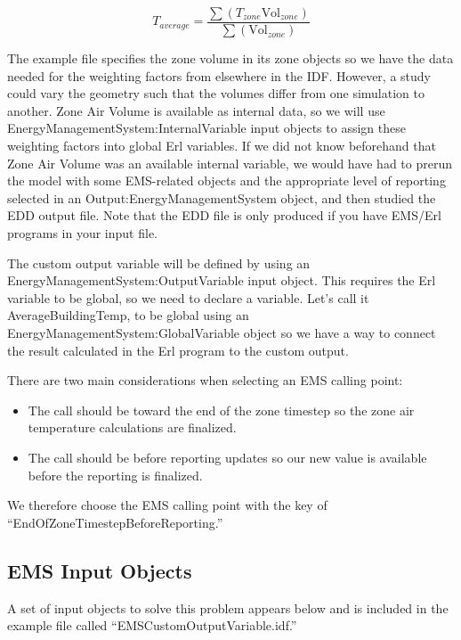 \begin{equation}
T_{average} = \frac{\sum\left(T_{zone}\text{Vol}_{zone}\right)}{\sum\left(\text{Vol}_{zone}\right)}
\end{equation}

The example file specifies the zone volume in its zone objects so we have the data needed for the weighting factors from elsewhere in the IDF. However, a study could vary the geometry such that the volumes differ from one simulation to another. Zone Air Volume is available as internal data, so we will use EnergyManagementSystem:InternalVariable input objects to assign these weighting factors into global Erl variables. If we did not know beforehand that Zone Air Volume was an available internal variable, we would have had to prerun the model with some EMS-related objects and the appropriate level of reporting selected in an Output:EnergyManagementSystem object, and then studied the EDD output file. Note that the EDD file is only produced if you have EMS/Erl programs in your input file.

The custom output variable will be defined by using an EnergyManagementSystem:OutputVariable input object. This requires the Erl variable to be global, so we need to declare a variable. Let's call it AverageBuildingTemp, to be global using an EnergyManagementSystem:GlobalVariable object so we have a way to connect the result calculated in the Erl program to the custom output.

There are two main considerations when selecting an EMS calling point:

\begin{itemize}
\item
  The call should be toward the end of the zone timestep so the zone air temperature calculations are finalized.
\item
  The call should be before reporting updates so our new value is available before the reporting is finalized.
\end{itemize}

We therefore choose the EMS calling point with the key of ``EndOfZoneTimestepBeforeReporting.''

\subsection{EMS Input Objects}\label{ems-input-objects}

A set of input objects to solve this problem appears below and is included in the example file called ``EMSCustomOutputVariable.idf.''

